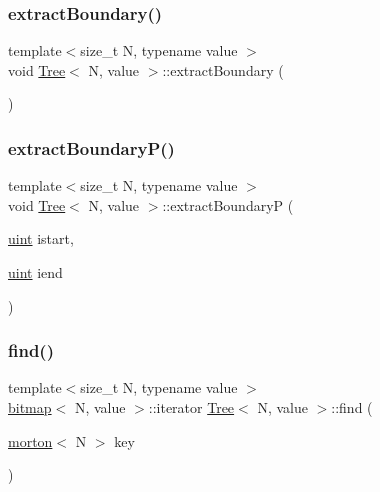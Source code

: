 \subsubsection{\texorpdfstring{extract\+Boundary()}{extractBoundary()}}
{\footnotesize\ttfamily template$<$size\+\_\+t N, typename value $>$ \\
void \mbox{\hyperlink{classTree}{Tree}}$<$ N, value $>$\+::extract\+Boundary (\begin{DoxyParamCaption}{ }\end{DoxyParamCaption})}

\mbox{\label{classTree_a9e107129872bf20de6ea619136a74929}} 
\subsubsection{\texorpdfstring{extract\+Boundary\+P()}{extractBoundaryP()}}
{\footnotesize\ttfamily template$<$size\+\_\+t N, typename value $>$ \\
void \mbox{\hyperlink{classTree}{Tree}}$<$ N, value $>$\+::extract\+BoundaryP (\begin{DoxyParamCaption}\item[{\mbox{\hyperlink{definitions_8h_a69aa29b598b851b0640aa225a9e5d61d}{uint}}}]{istart,  }\item[{\mbox{\hyperlink{definitions_8h_a69aa29b598b851b0640aa225a9e5d61d}{uint}}}]{iend }\end{DoxyParamCaption})}

\mbox{\label{classTree_a8337d6639f90ef96e4d42e1cbfab61dd}} 
\subsubsection{\texorpdfstring{find()}{find()}}
{\footnotesize\ttfamily template$<$size\+\_\+t N, typename value $>$ \\
\mbox{\hyperlink{definitions_8h_acf2396ef4de9eb8a6324b9f1a624ea85}{bitmap}}$<$ N, value $>$\+::iterator \mbox{\hyperlink{classTree}{Tree}}$<$ N, value $>$\+::find (\begin{DoxyParamCaption}\item[{\mbox{\hyperlink{definitions_8h_af8682350bd8bb38ee9023f7a0a310add}{morton}}$<$ N $>$}]{key }\end{DoxyParamCaption})\hspace{0.3cm}{\ttfamily [virtual]}}

